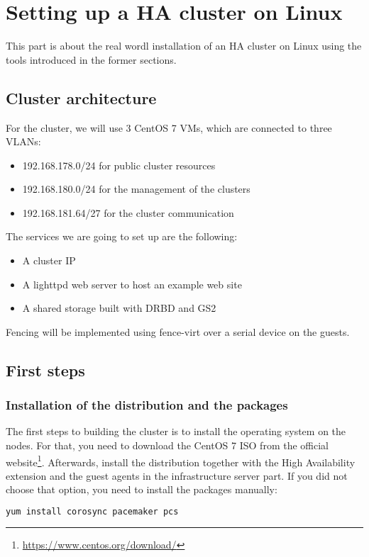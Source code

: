 \section{Setting up a HA cluster on Linux}
This part is about the real wordl installation of an \ac{HA} cluster on Linux using the tools introduced in the former sections.

\subsection{Cluster architecture}
For the cluster, we will use 3 CentOS 7 \acp{VM}, which are connected
to three \acp{VLAN}: 
\begin{itemize}
\item 192.168.178.0/24 for public cluster resources
\item 192.168.180.0/24 for the management of the clusters
\item 192.168.181.64/27 for the cluster communication
\end{itemize}
The services we are going to set up are the following:
\begin{itemize}
\item A cluster IP
\item A lighttpd web server to host an example web site
\item A shared storage built with DRBD and GS2
\end{itemize}

Fencing will be implemented using fence-virt over a serial device
on the guests.

\subsection{First steps}

\subsubsection{Installation of the distribution and the packages}
The first steps to building the cluster is to install the operating system on the nodes.
For that, you need to download the CentOS 7 ISO from the official website\footnote{\url{https://www.centos.org/download/}}.
Afterwards, install the distribution together with the High Availability extension
and the guest agents in the infrastructure server part.
If you did not choose that option, you need to install the packages manually:
\begin{lstlisting}[language=sh]
yum install corosync pacemaker pcs
\end{lstlisting}
